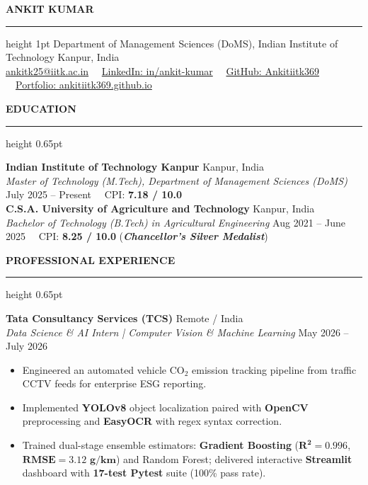 \documentclass[10pt]{article}
\newcommand{\resumesection}[1]{%
  \vspace{2pt}%
  {\large \textbf{\uppercase{#1}}}%
  \vspace{1pt}%
  \hrule height 0.65pt%
  \vspace{1.5pt}%
}
\begin{document}
\begin{center}
    {\Huge \textbf{ANKIT KUMAR}}\\ 
    \vspace{2pt}
    \hrule height 1pt
    \vspace{3pt}
    Department of Management Sciences (DoMS), Indian Institute of Technology Kanpur, India\\
    \href{mailto:ankitk25@iitk.ac.in}{ankitk25@iitk.ac.in} \ \textbullet \ 
    \href{https://linkedin.com/in/ankit-kumar}{LinkedIn: in/ankit-kumar} \ \textbullet \ 
    \href{https://github.com/Ankitiitk369}{GitHub: Ankitiitk369} \ \textbullet \ 
    \href{https://ankitiitk369.github.io}{Portfolio: ankitiitk369.github.io}
\end{center}

\vspace{-3pt}

\resumesection{Education}

\textbf{Indian Institute of Technology Kanpur} \hfill Kanpur, India\\
\textit{Master of Technology (M.Tech), Department of Management Sciences (DoMS)} \hfill July 2025 -- Present \ \textbullet \ CPI: \textbf{7.18 / 10.0}\\
\textbf{C.S.A. University of Agriculture and Technology} \hfill Kanpur, India\\
\textit{Bachelor of Technology (B.Tech) in Agricultural Engineering} \hfill Aug 2021 -- June 2025 \ \textbullet \ CPI: \textbf{8.25 / 10.0} (\textit{\textbf{Chancellor's Silver Medalist}})

\resumesection{Professional Experience}

\textbf{Tata Consultancy Services (TCS)} \hfill Remote / India\\
\textit{Data Science \& AI Intern | Computer Vision \& Machine Learning} \hfill May 2026 -- July 2026
\begin{itemize}[noitemsep, topsep=1pt, partopsep=0pt, parsep=0pt]
    \item Engineered an automated vehicle $\text{CO}_2$ emission tracking pipeline from traffic CCTV feeds for enterprise ESG reporting.
    \item Implemented \textbf{YOLOv8} object localization paired with \textbf{OpenCV} preprocessing and \textbf{EasyOCR} with regex syntax correction.
    \item Trained dual-stage ensemble estimators: \textbf{Gradient Boosting} ($\mathbf{R^2 = 0.996}$, $\mathbf{\text{RMSE} = 3.12\text{ g/km}}$) and Random Forest; delivered interactive \textbf{Streamlit} dashboard with \textbf{17-test Pytest} suite (100\% pass rate).
\end{itemize}
\end{document}
